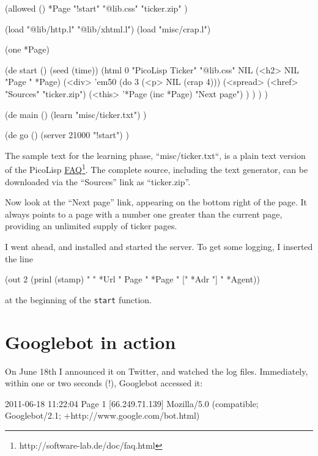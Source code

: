 \begin{wideverbatim}
   (allowed ()
      *Page "!start" "@lib.css" "ticker.zip" )

   (load "@lib/http.l" "@lib/xhtml.l")
   (load "misc/crap.l")

   (one *Page)

\end{wideverbatim}

\begin{wideverbatim}

   (de start ()
      (seed (time))
      (html 0 "PicoLisp Ticker" "@lib.css" NIL
         (<h2> NIL "Page " *Page)
         (<div> 'em50
            (do 3 (<p> NIL (crap 4)))
            (<spread>
               (<href> "Sources" "ticker.zip")
               (<this> '*Page (inc *Page) "Next page") ) ) ) )

   (de main ()
      (learn "misc/ticker.txt") )

   (de go ()
      (server 21000 "!start") )
\end{wideverbatim}

The sample text for the learning phase, ``misc/ticker.txt``, is a
plain text version of the PicoLisp
\underline{FAQ}\footnote{http://software-lab.de/doc/faq.html}. The
complete source, including the text generator, can be downloaded via
the ``Sources'' link as ``ticker.zip''.

Now look at the ``Next page'' link, appearing on the bottom right of
the page. It always points to a page with a number one greater than
the current page, providing an unlimited supply of ticker pages.

I went ahead, and installed and started the server. To get some
logging, I inserted the line

\begin{wideverbatim}
   (out 2 (prinl (stamp) " {" *Url "} Page " *Page "  [" *Adr "] " *Agent))
\end{wideverbatim}

at the beginning of the \texttt{start} function.

\section{Googlebot in action}
\label{sec:pl-ticker-googlebot-in-action}

On June 18th I announced it on Twitter, and watched the log files. Immediately,
within one or two seconds (!), Googlebot accessed it:

\begin{wideverbatim}
  2011-06-18 11:22:04  Page 1  [66.249.71.139] Mozilla/5.0
  (compatible; Googlebot/2.1; +http://www.google.com/bot.html)
\end{wideverbatim}

